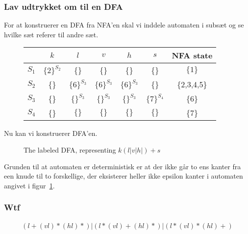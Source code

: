 \subsubsection{Lav udtrykket om til en DFA}
For at konstruerer en DFA fra NFA'en skal vi inddele automaten i subsæt og se hvilke sæt referer til andre sæt.
\begin{figure}[!ht]
    \centering
    \begin{tabular}{c|cccccc}
            &$k$&$l$&$v$&$h$&$s$&NFA state\\\hline
        $S_1$&$\{2\}^{S_2}$&\{\}&\{\}& \{\}&\{\}& $\{1\}$\\
        $S_2$&\{\}&$\{6\}^{S_3}$&$\{6\}^{S_3}$&$\{6\}^{S_3}$&\{\}&\{2,3,4,5\}\\
        $S_3$&\{\}&$\{\}^{S_3}$&$\{\}^{S_3}$&$\{\}^{S_3}$&$\{7\}^{S_4}$&\{6\}\\
        $S_4$&\{\}&$\{\}$&$\{\}$&$\{\}$&$\{\}$&\{7\}
    \end{tabular}
\end{figure}
Nu kan vi konstruerer DFA'en.
\begin{figure}[!ht]
    \centering
    \caption{The labeled DFA, representing $k(l|v|h|)+s$}\label{fig:2016:examfigdfa}
\end{figure}
Grunden til at automaten er deterministisk er at der ikke går to ens kanter fra een knude til to forskellige, der eksisterer heller ikke epsilon kanter i automaten angivet i figur~\ref{fig:2016:examfigdfa}.
\subsubsection{Wtf}
\begin{align*}
    (l+(vl)*(hl)*)|(l*(vl)+(hl)*)|(l*(vl)*(hl)+)
\end{align*}